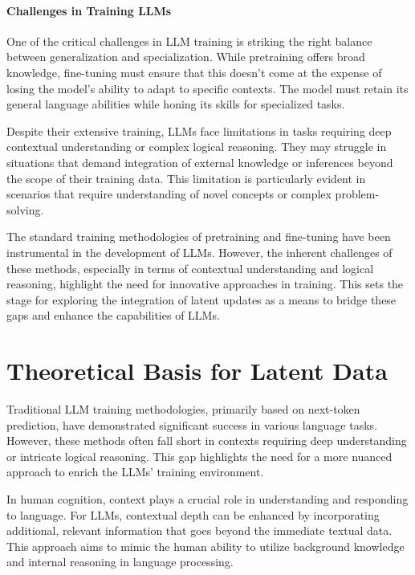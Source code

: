 \documentclass[
]{article}
\begin{document}
\hypertarget{challenges-in-training-llms}{%
\paragraph*{Challenges in Training
LLMs}\label{challenges-in-training-llms}}

One of the critical challenges in LLM training is striking the right
balance between generalization and specialization. While pretraining
offers broad knowledge, fine-tuning must ensure that this doesn't come
at the expense of losing the model's ability to adapt to specific
contexts. The model must retain its general language abilities while
honing its skills for specialized tasks.

Despite their extensive training, LLMs face limitations in tasks
requiring deep contextual understanding or complex logical reasoning.
They may struggle in situations that demand integration of external
knowledge or inferences beyond the scope of their training data. This
limitation is particularly evident in scenarios that require
understanding of novel concepts or complex problem-solving.

The standard training methodologies of pretraining and fine-tuning have
been instrumental in the development of LLMs. However, the inherent
challenges of these methods, especially in terms of contextual
understanding and logical reasoning, highlight the need for innovative
approaches in training. This sets the stage for exploring the
integration of latent updates as a means to bridge these gaps and
enhance the capabilities of LLMs.

\hypertarget{theoretical-basis-for-latent-data}{%
\section{Theoretical Basis for Latent
Data}\label{theoretical-basis-for-latent-data}}

Traditional LLM training methodologies, primarily based on next-token
prediction, have demonstrated significant success in various language
tasks. However, these methods often fall short in contexts requiring
deep understanding or intricate logical reasoning. This gap highlights
the need for a more nuanced approach to enrich the LLMs' training
environment.

In human cognition, context plays a crucial role in understanding and
responding to language. For LLMs, contextual depth can be enhanced by
incorporating additional, relevant information that goes beyond the
immediate textual data. This approach aims to mimic the human ability to
utilize background knowledge and internal reasoning in language
processing.
\end{document}
